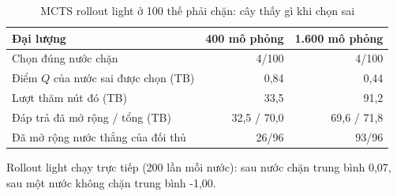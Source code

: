 \begin{table}[H]
  \centering
  \small
  \caption{MCTS rollout light ở 100 thế phải chặn: cây thấy gì khi chọn sai}
  \label{tab:cs-ct-rollout}
  \begin{tabular}{lrr}
    \toprule
    Đại lượng & 400 mô phỏng & 1.600 mô phỏng \\
    \midrule
    Chọn đúng nước chặn & 4/100 & 4/100 \\
    Điểm $Q$ của nước sai được chọn (TB) & 0,84 & 0,44 \\
    Lượt thăm nút đó (TB) & 33,5 & 91,2 \\
    Đáp trả đã mở rộng / tổng (TB) & 32,5 / 70,0 & 69,6 / 71,8 \\
    Đã mở rộng nước thắng của đối thủ & 26/96 & 93/96 \\
    \bottomrule
  \end{tabular}
  \par\smallskip\parbox{.95\linewidth}{\footnotesize Rollout light chạy trực tiếp (200 lần mỗi nước): sau nước chặn trung bình 0,07, sau một nước không chặn trung bình -1,00.}
\end{table}
